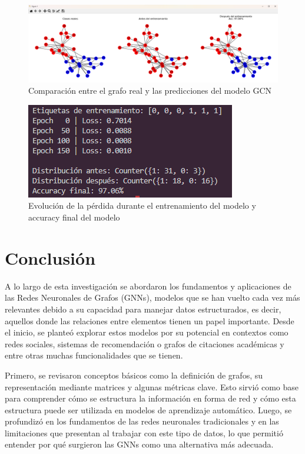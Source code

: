 \documentclass[11pt]{article} %
\begin{document}
\begin{figure}[H]
    \centering
    \includegraphics[width=0.9\linewidth]{Images/comparacionGCN.png}
    \caption{Comparación entre el grafo real y las predicciones del modelo GCN}
    \label{fig:comparacionGCN}
\end{figure}

\begin{figure}[H]
    \centering
    \includegraphics[width=0.7\linewidth]{Images/lossesGCN.png}
    \caption{Evolución de la pérdida durante el entrenamiento del modelo y accuracy final del modelo}
    \label{fig:lossesGCN}
\end{figure}

\newpage


\section{Conclusión}

A lo largo de esta investigación se abordaron los fundamentos y aplicaciones de las Redes Neuronales de Grafos (GNNs), modelos que se han vuelto cada vez más relevantes debido a su capacidad para manejar datos estructurados, es decir, aquellos donde las relaciones entre elementos tienen un papel importante. Desde el inicio, se planteó explorar estos modelos por su potencial en contextos como redes sociales, sistemas de recomendación o grafos de citaciones académicas y entre otras muchas funcionalidades que se tienen.

Primero, se revisaron conceptos básicos como la definición de grafos, su representación mediante matrices y algunas métricas clave. Esto sirvió como base para comprender cómo se estructura la información en forma de red y cómo esta estructura puede ser utilizada en modelos de aprendizaje automático. Luego, se profundizó en los fundamentos de las redes neuronales tradicionales y en las limitaciones que presentan al trabajar con este tipo de datos, lo que permitió entender por qué surgieron las GNNs como una alternativa más adecuada.
\end{document}

